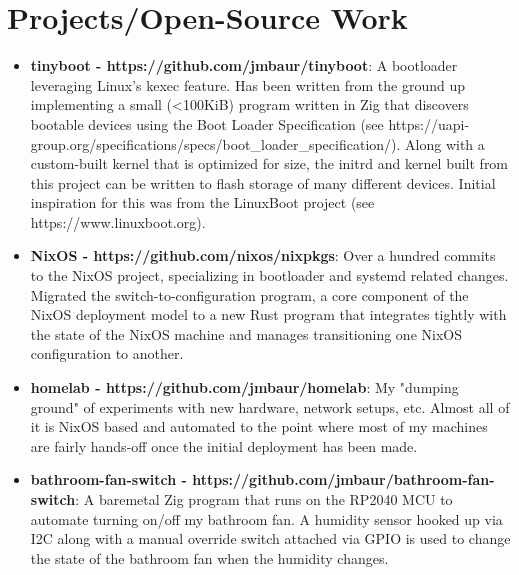 \documentclass[a4paper,20pt]{article}
\newcommand{\resumeItem}[2]{\item\small{\textbf{#1}{: #2 \vspace{-2pt}}}}
\newcommand{\resumeSubItem}[2]{\resumeItem{#1}{#2}\vspace{-3pt}}
\newcommand{\resumeSubHeadingListStart}{\begin{itemize}[leftmargin=*]}
\newcommand{\resumeSubHeadingListEnd}{\end{itemize}}
\begin{document}
\section{Projects/Open-Source Work}
\resumeSubHeadingListStart
\resumeSubItem{tinyboot - https://github.com/jmbaur/tinyboot}
{A bootloader leveraging Linux's kexec feature. Has been written from the
ground up implementing a small (<100KiB) program written in Zig that discovers
bootable devices using the Boot Loader Specification (see
https://uapi-group.org/specifications/specs/boot\_loader\_specification/).
Along with a custom-built kernel that is optimized for size, the initrd and
kernel built from this project can be written to flash storage of many
different devices. Initial inspiration for this was from the LinuxBoot project
(see https://www.linuxboot.org).}
\vspace{2pt}
\resumeSubItem{NixOS - https://github.com/nixos/nixpkgs}
{Over a hundred commits to the NixOS project, specializing in bootloader and
systemd related changes. Migrated the switch-to-configuration program, a core
component of the NixOS deployment model to a new Rust program that integrates
tightly with the state of the NixOS machine and manages transitioning one NixOS
configuration to another.}
\vspace{2pt}
\resumeSubItem{homelab - https://github.com/jmbaur/homelab}
{My "dumping ground" of experiments with new hardware, network setups, etc.
Almost all of it is NixOS based and automated to the point where most of my
machines are fairly hands-off once the initial deployment has been made.}
\vspace{2pt}
\resumeSubItem{bathroom-fan-switch - https://github.com/jmbaur/bathroom-fan-switch}
{A baremetal Zig program that runs on the RP2040 MCU to automate turning on/off
my bathroom fan. A humidity sensor hooked up via I2C along with a manual
override switch attached via GPIO is used to change the state of the bathroom
fan when the humidity changes.}
\resumeSubHeadingListEnd
\end{document}
